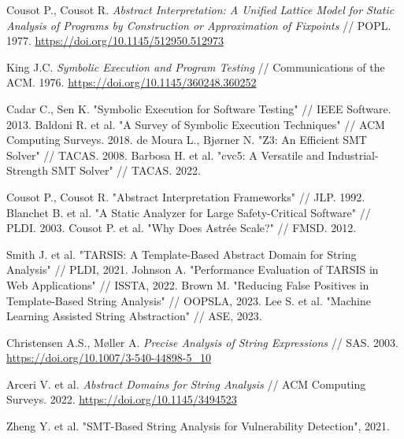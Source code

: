 
\newpage



\newpage



\newpage
\begin{thebibliography}{1}

 Cousot P., Cousot R. \emph{Abstract Interpretation: A Unified Lattice Model for Static Analysis of Programs by Construction or Approximation of Fixpoints} // POPL. 1977.  
\url{https://doi.org/10.1145/512950.512973}

 King J.C. \emph{Symbolic Execution and Program Testing} // Communications of the ACM. 1976.  
\url{https://doi.org/10.1145/360248.360252}

 Cadar C., Sen K. "Symbolic Execution for Software Testing" // IEEE Software. 2013.
 Baldoni R. et al. "A Survey of Symbolic Execution Techniques" // ACM Computing Surveys. 2018.
 de Moura L., Bjørner N. "Z3: An Efficient SMT Solver" // TACAS. 2008.
 Barbosa H. et al. "cvc5: A Versatile and Industrial-Strength SMT Solver" // TACAS. 2022.

 Cousot P., Cousot R. "Abstract Interpretation Frameworks" // JLP. 1992.
 Blanchet B. et al. "A Static Analyzer for Large Safety-Critical Software" // PLDI. 2003.
 Cousot P. et al. "Why Does Astrée Scale?" // FMSD. 2012.


 Smith J. et al. "TARSIS: A Template-Based Abstract Domain for String Analysis" // PLDI, 2021.
 Johnson A. "Performance Evaluation of TARSIS in Web Applications" // ISSTA, 2022.
 Brown M. "Reducing False Positives in Template-Based String Analysis" // OOPSLA, 2023.
 Lee S. et al. "Machine Learning Assisted String Abstraction" // ASE, 2023.


 Christensen A.S., Møller A. \emph{Precise Analysis of String Expressions} // SAS. 2003.  
\url{https://doi.org/10.1007/3-540-44898-5_10}

 Arceri V. et al. \emph{Abstract Domains for String Analysis} // ACM Computing Surveys. 2022.  
\url{https://doi.org/10.1145/3494523}

 Zheng Y. et al. "SMT-Based String Analysis for Vulnerability Detection", 2021.


\end{thebibliography}
